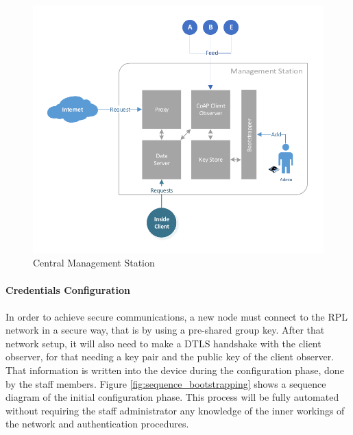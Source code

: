 \begin{figure}[h]
  \centering
  \includegraphics[width=0.92\linewidth]{figures/White_Box_Model.pdf}
  \caption{Central Management Station}
  \label{fig:core_components}
\end{figure}

\paragraph{\textbf{Credentials Configuration}}
\paragraph{}
In order to achieve secure communications, a new node must connect to the RPL network in a secure way, that is by using a pre-shared group key. After that network setup, it will also need to make a DTLS handshake with the client observer, for that needing a key pair and the public key of the client observer. That information is written into the device during the configuration phase, done by the staff members. Figure \ref{fig:sequence_bootstrapping} shows a sequence diagram of the initial configuration phase. This process will be fully automated without requiring the staff administrator any knowledge of the inner workings of the network and authentication procedures.


